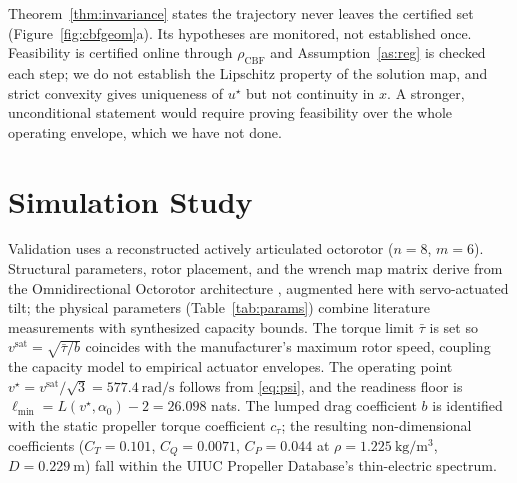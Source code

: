 \documentclass[letter, 10 pt, journal, twoside]{IEEEtran}
\theoremstyle{compact}
\begin{document}
Theorem~\ref{thm:invariance} states the trajectory never leaves the certified set (Figure~\ref{fig:cbfgeom}a). Its hypotheses are monitored, not established once. Feasibility is certified online through $\rho_{\mathrm{CBF}}$ and Assumption~\ref{as:reg} is checked each step; we do not establish the Lipschitz property of the solution map, and strict convexity gives uniqueness of $u^\star$ but not continuity in $x$. A stronger, unconditional statement would require proving feasibility over the whole operating envelope, which we have not done.



\section{Simulation Study}
\label{sec:sim}

Validation uses a reconstructed actively articulated octorotor ($n=8$, $m=6$). Structural parameters, rotor placement, and the wrench map matrix derive from the Omnidirectional Octorotor architecture \cite{Hamandi2025prototype}, augmented here with servo-actuated tilt; the physical parameters (Table~\ref{tab:params}) combine literature measurements with synthesized capacity bounds. The torque limit $\bar{\tau}$ is set so $v^{\mathrm{sat}}=\sqrt{\bar{\tau}/b}$ coincides with the manufacturer's maximum rotor speed, coupling the capacity model to empirical actuator envelopes. The operating point $v^\star=v^{\mathrm{sat}}/\sqrt{3}=\SI{577.4}{\radian\per\second}$ follows from \eqref{eq:psi}, and the readiness floor is $\ell_{\min}=L(v^\star,\alpha_0)-2=26.098$ nats. The lumped drag coefficient $b$ is identified with the static propeller torque coefficient $c_\tau$; the resulting non-dimensional coefficients ($C_T=0.101$, $C_Q=0.0071$, $C_P=0.044$ at $\rho=\SI{1.225}{\kilo\gram\per\metre\cubed}$, $D=\SI{0.229}{\metre}$) fall within the UIUC Propeller Database's \cite{UIUCPropDB} thin-electric spectrum.
\end{document}
